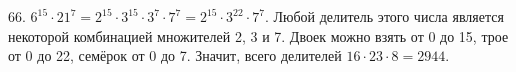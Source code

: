 66. $6^{15}\cdot21^{7}=2^{15}\cdot3^{15}\cdot3^{7}\cdot7^{7}=2^{15}\cdot3^{22}\cdot7^7.$ Любой делитель этого числа является некоторой комбинацией множителей 2, 3 и 7. Двоек можно взять от 0 до 15, трое от 0 до 22, семёрок от 0 до 7. Значит, всего делителей $16\cdot23\cdot8=2944.$\\
